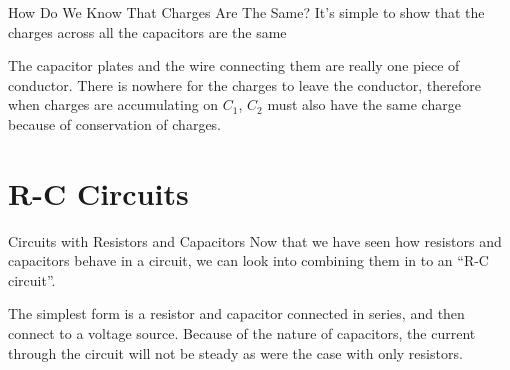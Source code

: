 \documentclass[12pt,aspectratio=169]{beamer}
\begin{document}
\begin{frame}{How Do We Know That Charges Are The Same?}
  It's simple to show that the charges across all the capacitors are the same
  \begin{center}
  \end{center}
  The capacitor plates and the wire connecting them are really one piece of
  conductor. There is nowhere for the charges to leave the conductor, therefore
  when charges are accumulating on $C_1$, $C_2$ must also have the same charge
  because of conservation of charges.
\end{frame}



\section{R-C Circuits}

\begin{frame}{Circuits with Resistors and Capacitors}
  Now that we have seen how resistors and capacitors behave in a circuit, we
  can look into combining them in to an ``R-C circuit''.
  \begin{center}
  \end{center}
  The simplest form is a resistor and capacitor connected in series, and
  then connect to a voltage source. Because of the nature of capacitors, the
  current through the circuit will not be steady as were the case with only
  resistors.
\end{frame}
\end{document}
